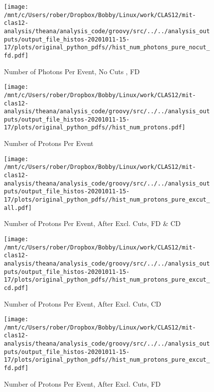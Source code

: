 \documentclass{article}
\begin{document}
\begin{landscape}
\begin{figure}[h]
        \texttt{[image: /mnt/c/Users/rober/Dropbox/Bobby/Linux/work/CLAS12/mit-clas12-analysis/theana/analysis\_code/groovy/src/../../analysis\_outputs/output\_file\_histos-20201011-15-17/plots/original\_python\_pdfs//hist\_num\_photons\_pure\_nocut\_fd.pdf]}
        \captionsetup{textformat=empty,labelformat=blank}
        \caption{Number of Photons Per Event, No Cuts , FD}
    \end{figure}
    \clearpage
    
    \begin{figure}[h]
        \centering

        \texttt{[image: /mnt/c/Users/rober/Dropbox/Bobby/Linux/work/CLAS12/mit-clas12-analysis/theana/analysis\_code/groovy/src/../../analysis\_outputs/output\_file\_histos-20201011-15-17/plots/original\_python\_pdfs//hist\_num\_protons.pdf]}
        \captionsetup{textformat=empty,labelformat=blank}
        \caption{Number of Protons Per Event}
    \end{figure}
    \clearpage
    
    \begin{figure}[h]
        \centering

        \texttt{[image: /mnt/c/Users/rober/Dropbox/Bobby/Linux/work/CLAS12/mit-clas12-analysis/theana/analysis\_code/groovy/src/../../analysis\_outputs/output\_file\_histos-20201011-15-17/plots/original\_python\_pdfs//hist\_num\_protons\_pure\_excut\_all.pdf]}
        \captionsetup{textformat=empty,labelformat=blank}
        \caption{Number of Protons Per Event, After Excl. Cuts, FD \& CD}
    \end{figure}
    \clearpage
    
    \begin{figure}[h]
        \centering

        \texttt{[image: /mnt/c/Users/rober/Dropbox/Bobby/Linux/work/CLAS12/mit-clas12-analysis/theana/analysis\_code/groovy/src/../../analysis\_outputs/output\_file\_histos-20201011-15-17/plots/original\_python\_pdfs//hist\_num\_protons\_pure\_excut\_cd.pdf]}
        \captionsetup{textformat=empty,labelformat=blank}
        \caption{Number of Protons Per Event, After Excl. Cuts, CD}
    \end{figure}
    \clearpage
    
    \begin{figure}[h]
        \centering

        \texttt{[image: /mnt/c/Users/rober/Dropbox/Bobby/Linux/work/CLAS12/mit-clas12-analysis/theana/analysis\_code/groovy/src/../../analysis\_outputs/output\_file\_histos-20201011-15-17/plots/original\_python\_pdfs//hist\_num\_protons\_pure\_excut\_fd.pdf]}
        \captionsetup{textformat=empty,labelformat=blank}
        \caption{Number of Protons Per Event, After Excl. Cuts, FD}
    \end{figure}
    \clearpage
    

\end{landscape}
\end{document}
